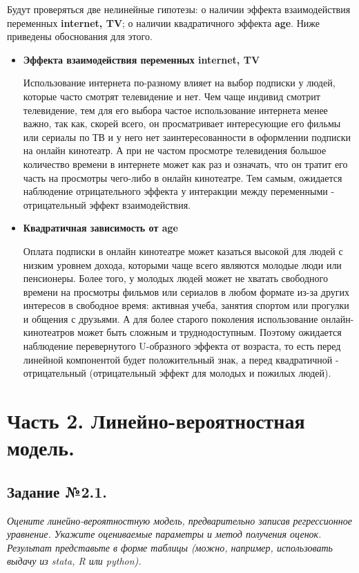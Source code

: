 \documentclass[a4paper,12pt]{article}
\begin{document}
		 \vspace{0.2cm}
		 
	Будут проверяться две нелинейные гипотезы: о наличии эффекта взаимодействия переменных \textbf{internet, TV}; о наличии квадратичного эффекта \textbf{age}. Ниже приведены обоснования для этого.
	
	\begin{itemize}
		\item \textbf{Эффекта взаимодействия переменных \textbf{internet, TV}}
		
		Использование интернета по-разному влияет на выбор подписки у людей, которые часто смотрят телевидение и нет. Чем чаще индивид смотрит телевидение, тем для его выбора частое использование интернета менее важно, так как, скорей всего, он просматривает интересующие его фильмы или сериалы по ТВ и у него нет заинтересованности в оформлении подписки на онлайн кинотеатр. А при не частом просмотре телевидения большое количество времени в интернете может как раз и означать, что он тратит его часть на просмотры чего-либо в онлайн кинотеатре. Тем самым, ожидается наблюдение отрицательного эффекта у интеракции между переменными - отрицательный эффект взаимодействия.

		\item \textbf{Квадратичная зависимость от age}
		
		Оплата подписки в онлайн кинотеатре может казаться высокой для людей с низким уровнем дохода, которыми чаще всего являются молодые люди или пенсионеры. Более того, у молодых людей может не хватать свободного времени на просмотры фильмов или сериалов в любом формате из-за других интересов в свободное время: активная учеба, занятия спортом или прогулки и общения с друзьями. А для более старого поколения использование онлайн-кинотеатров может быть сложным и труднодоступным. Поэтому ожидается наблюдение перевернутого U-образного эффекта от возраста, то есть перед линейной компонентой будет положительный знак, а перед квадратичной - отрицательный (отрицательный эффект для молодых и пожилых людей).
		
	\end{itemize}
	
	\newpage
	
	\section{Часть 2. Линейно-вероятностная модель.}
	
	\subsection{Задание №2.1.}
		\textit{
				 Оцените линейно-вероятностную модель, предварительно записав регрессионное уравнение. Укажите оцениваемые параметры и метод получения оценок. Результат представьте в форме таблицы (можно, например, использовать выдачу из stata, R или python).
		}
\end{document}
